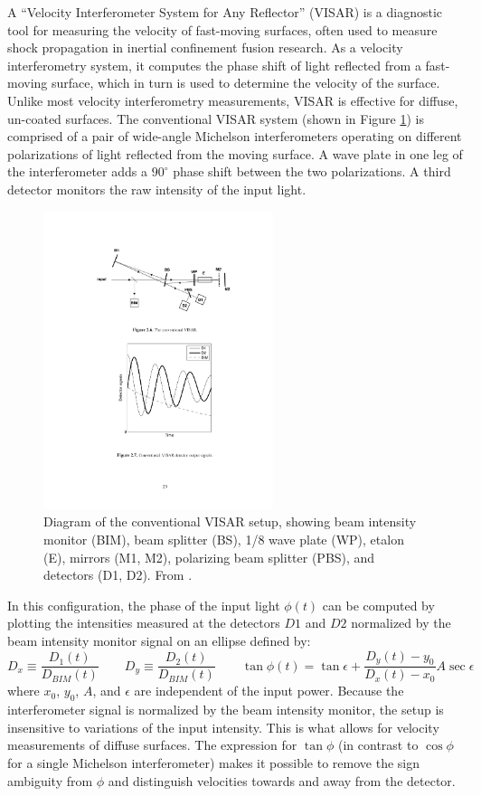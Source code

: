 \documentclass{jpp}
\begin{document}
A ``Velocity Interferometer System for Any Reflector'' (VISAR) is a diagnostic tool for measuring the velocity of fast-moving surfaces, often used to measure shock propagation in inertial confinement fusion research. As a velocity interferometry system, it computes the phase shift of light reflected from a fast-moving surface, which in turn is used to determine the velocity of the surface. Unlike most velocity interferometry measurements, VISAR is effective for diffuse, un-coated surfaces. The conventional VISAR system (shown in Figure \ref{fig:visar}) is comprised of a pair of wide-angle Michelson interferometers operating on different polarizations of light reflected from the moving surface. A wave plate in one leg of the interferometer adds a $90^\circ$ phase shift between the two polarizations. A third detector monitors the raw intensity of the input light.
\begin{figure}
  \centering
  \includegraphics[width=0.6\textwidth]{visar.pdf}
  \caption{Diagram of the conventional VISAR setup, showing beam intensity monitor (BIM), beam splitter (BS), 1/8 wave plate (WP), etalon (E), mirrors (M1, M2), polarizing beam splitter (PBS), and detectors (D1, D2). From \citep{10.2172/886901}.}
\label{fig:visar}
\end{figure}
In this configuration, the phase of the input light $\phi(t)$ can be computed by plotting the intensities measured at the detectors $D1$ and $D2$ normalized by the beam intensity monitor signal on an ellipse defined by:
\begin{equation*}
D_x \equiv \frac{D_1(t)}{D_{BIM} (t)} \qquad D_y \equiv \frac{D_2 (t)}{D_{BIM}(t)} \qquad \tan \phi (t) = \tan \epsilon + \frac{D_y (t) - y_0 }{D_x (t) - x_0} A \sec \epsilon
\end{equation*}
where $x_0$, $y_0$, $A$, and $\epsilon$ are independent of the input power. Because the interferometer signal is normalized by the beam intensity monitor, the setup is insensitive to variations of the input intensity. This is what allows for velocity measurements of diffuse surfaces. The expression for $\tan \phi$ (in contrast to $\cos \phi$ for a single Michelson interferometer) makes it possible to remove the sign ambiguity from $\phi$ and distinguish velocities towards and away from the detector.
\end{document}
